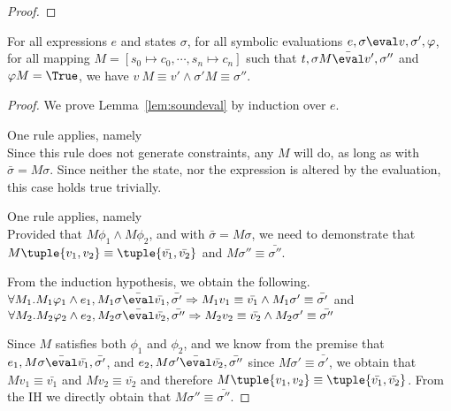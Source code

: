 \begin{proof}
\end{proof}


\begin{lemma}
  \label{lem:soundeval}

  For all expressions $e$ and states $\sigma$,
  for all symbolic evaluations $e,\sigma\eval v,\sigma',\phi$,
  for all mapping $M=[s_0\mapsto c_0,\cdots,s_n\mapsto c_n]$
  such that $t,\sigma M \bar{\eval}v',\sigma''$ and $\phi M = \True$,
  we have $v\ M \equiv v' \wedge \sigma' M \equiv \sigma''$.

\end{lemma}

\begin{proof}
  We prove Lemma~\ref{lem:soundeval} by induction over $e$.

  {One rule applies, namely \\
  Since this rule does not generate constraints, any $M$ will do,
  as long as  with $\bar{\sigma}=M \sigma$.
  Since neither the state, nor the expression is altered by the evaluation,
  this case holds true trivially.
  }

  {One rule applies, namely \\
  Provided that $M\phi_1\wedge M\phi_2$,
  and  with $\bar{\sigma}=M\sigma$,
  we need to demonstrate that $M\tuple{v_1,v_2} \equiv \tuple{\bar{v_1},\bar{v_2}}$ and $M\sigma''\equiv\bar{\sigma''}$.

  From the induction hypothesis, we obtain the following.\\
  $\forall M_1 .  M_1\phi_1 \wedge e_1, M_1\sigma \bar{\eval}\bar{v_1},\bar{\sigma'}\implies  M_1v_1\equiv \bar{v_1} \wedge  M_1\sigma'\equiv\bar{\sigma'}$ and\\
  $\forall M_2 . M_2\phi_2 \wedge e_2,M_2\sigma \bar{\eval}\bar{v_2},\bar{\sigma''}\implies M_2v_2\equiv \bar{v_2} \wedge M_2\sigma'\equiv\bar{\sigma''}$

  Since $M$ satisfies both $\phi_1$ and $\phi_2$,
  and we know from the premise that $e_1,M\sigma \bar{\eval}\bar{v_1},\bar{\sigma'}$,
  and $e_2,M\sigma'\bar{\eval}\bar{v_2},\bar{\sigma''}$ since $M\sigma'\equiv \bar{\sigma'}$,
  we obtain that $M v_1\equiv \bar{v_1}$ and $M v_2 \equiv \bar{v_2}$ and therefore $M\tuple{v_1,v_2} \equiv \tuple{\bar{v_1},\bar{v_2}}$.
  From the IH we directly obtain that $M \sigma'' \equiv\bar{\sigma''}$.
  }


\end{proof}

